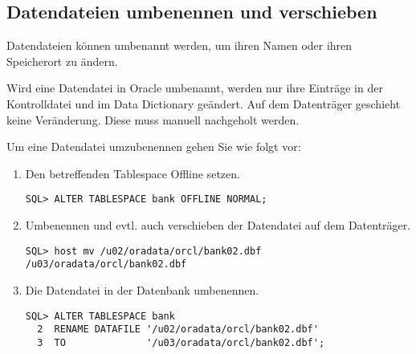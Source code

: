       \subsection{Datendateien umbenennen und verschieben}
        Datendateien k\"onnen umbenannt werden, um ihren Namen oder ihren Speicherort zu \"andern.
        \begin{merke}
          Wird eine Datendatei in Oracle umbenannt, werden nur ihre Eintr\"age in der Kontrolldatei und im Data Dictionary ge\"andert. Auf dem Datentr\"ager geschieht keine Ver\"anderung. Diese muss manuell nachgeholt werden.
        \end{merke}
        Um eine Datendatei umzubenennen gehen Sie wie folgt vor:
        \begin{enumerate}
          \item Den betreffenden Tablespace Offline setzen.
          \begin{lstlisting}[caption={Tablespace Offline setzen},label=admin127,language=oracle_sql]
SQL> ALTER TABLESPACE bank OFFLINE NORMAL;
          \end{lstlisting}
          \item Umbenennen und evtl. auch verschieben der Datendatei auf dem Datentr\"ager.
          \begin{lstlisting}[caption={Tablespace Offline setzen},label=admin127a,language=oracle_sql,alsolanguage=sqlplus]
SQL> host mv /u02/oradata/orcl/bank02.dbf /u03/oradata/orcl/bank02.dbf
          \end{lstlisting}
          \item Die Datendatei in der Datenbank umbenennen.
          \begin{lstlisting}[caption={Datendatei umbenennen},label=admin128,language=oracle_sql]
SQL> ALTER TABLESPACE bank
  2  RENAME DATAFILE '/u02/oradata/orcl/bank02.dbf'
  3  TO              '/u03/oradata/orcl/bank02.dbf';
          \end{lstlisting}
        \end{enumerate}
